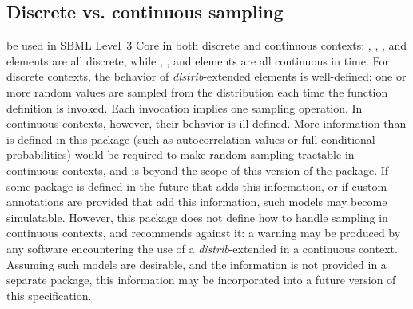 \documentclass[draftspec]{sbmlpkgspec}
\newcommand{\sbmlthreecore}{SBML Level~3 Core\xspace}
\newcommand{\CategoricalUnivariateDistribution}{\defRef{CategoricalUnivariateDistribution}{CategoricalUnivariateDistribution-class}}
\newcommand{\ContinuousUnivariateDistribution}{\defRef{ContinuousUnivariateDistribution}{ContinuousUnivariateDistribution-class}}
\newcommand{\DiscreteUnivariateDistribution}{\defRef{DiscreteUnivariateDistribution}{DiscreteUnivariateDistribution-class}}
\newcommand{\Distribution}{\defRef{Distribution}{Distribution-class}}
\newcommand{\MultivariateDistribution}{\defRef{MultivariateDistribution}{MultivariateDistribution-class}}
\newcommand{\ExternalDistribution}{\defRef{ExternalDistribution}{ExternalDistribution-class}}
\newcommand{\UnivariateDistribution}{\defRef{UnivariateDistribution}{UnivariateDistribution-class}}
\newcommand{\distribshort}{\emph{distrib}\xspace}
\newcommand{\distrib}{Distributions\xspace}
\newcommand{\mathml}{MathML\xspace}
\begin{document}


\subsection{Discrete vs. continuous sampling}
\label{discrete-continuous}

\changed{\mathml csymbols may} be used in \sbmlthreecore in both discrete and continuous contexts:  \InitialAssignment, \EventAssignment, \Priority, and \Delay elements are all discrete, while \Rule, \KineticLaw, and \Trigger elements are all continuous in time.  For discrete contexts, the behavior of \distribshort-extended \FunctionDefinition elements is well-defined:  one or more random values are sampled from the distribution each time the function definition is invoked. Each invocation implies one sampling operation.  In continuous contexts, however, their behavior is ill-defined.  More information than is defined in this package (such as autocorrelation values or full conditional probabilities) would be required to make random sampling tractable in continuous contexts, and is beyond the scope of this version of the package.  If some package is defined in the future that adds this information, or if custom annotations are provided that add this information, such models may become simulatable.  However, this package does not define how to handle sampling in continuous contexts, and recommends against it: a warning may be produced by any software encountering the use of a \distribshort-extended \changed{\mathml} in a continuous context.  Assuming such models are desirable, and the information is not provided in a separate package, this information may be incorporated into a future version of this specification.
\end{document}
